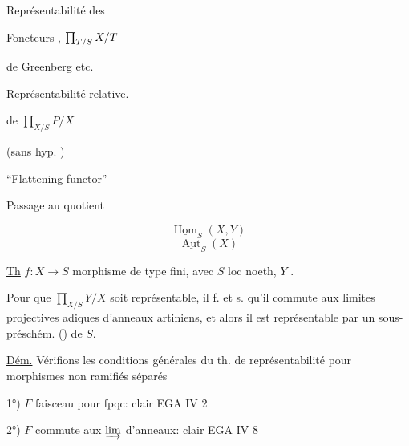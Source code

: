 Représentabilité des

Foncteurs , $\prod_{T/S}X/T$

de Greenberg etc.


Représentabilité relative.

de $\prod_{X/S}P/X$

(sans hyp. )


``Flattening functor''


Passage au quotient


\[
\underline{\operatorname{Hom}}_S(X,Y)
\]
\[
\underline{\operatorname{Aut}}_S(X)
\]


\uline{Th} $f:X\to S$ morphisme  de type fini, avec $S$ loc noeth, $Y$ .

Pour que $\prod_{X/S}Y/X$ soit représentable, il f. et s. qu'il commute aux limites projectives adiques d'anneaux artiniens, et alors il est représentable par un sous-préschém. () de $S$.




\uline{Dém.} Vérifions les conditions générales du th. de représentabilité pour morphismes non ramifiés séparés

1°) $F$ faisceau pour fpqc:  clair EGA IV 2

2°) $F$ commute aux $\varinjlim$ d'anneaux: clair EGA IV 8

